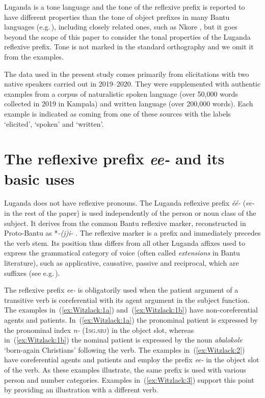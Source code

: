 \documentclass[output=paper,colorlinks,citecolor=brown,
]{langscibook}
\begin{document}
Luganda is a tone language and the tone of the reflexive prefix is reported to have different properties than the tone of object prefixes in many Bantu languages (e.g.\,\citealt{Marlo2015}), including closely related ones, such as Nkore \citep{Poletto1998}, 
but it goes beyond the scope of this paper to consider the tonal properties of the Luganda reflexive prefix. 
Tone is not marked in the standard orthography and we omit it from the examples.

The data used in the present study comes primarily from elicitations with two native speakers carried out in 2019–2020. 
They were supplemented with authentic examples from a corpus of naturalistic spoken language (over 50,000 words collected in 2019 in Kampala) and written language (over 200,000 words). 
Each example is indicated as coming from one of these sources with the labels `elicited', `spoken' and `written'.


\section{The reflexive prefix \emph{ee-} and its basic uses}\label{sec:Witzlack:2}

Luganda does not have reflexive pronouns. 
The Luganda reflexive prefix \emph{éé-} (\emph{ee-} in the rest of the paper) is used independently of the person or noun class of the subject. 
It derives from the common Bantu reflexive marker, reconstructed in Proto-Bantu as *\textit{-(j)i-} \citep[109–110]{Meeussen1967}. 
The reflexive marker is a prefix and immediately precedes the verb stem. 
Its position thus differs from all other Luganda affixes used to express the grammatical category of voice (often called \emph{extensions} in Bantu literature), such as applicative, causative, passive and reciprocal, which are suffixes (see e.g.\,\citealt[173]{SchadebergBostoen2019}).

The reflexive prefix \emph{ee-} is obligatorily used when the patient argument of a transitive verb is coreferential with its agent argument in the subject function. 
The examples in~(\ref{ex:Witzlack:1a}) and~(\ref{ex:Witzlack:1b}) have non-coreferential agents and patients. 
In~(\ref{ex:Witzlack:1a}) the pronominal patient is expressed by the pronominal index \emph{n-} (\textsc{1sg.sbj}) in the object slot, whereas in~(\ref{ex:Witzlack:1b}) the nominal patient is expressed by the noun \emph{abalokole} ‘born-again Christians’ following the verb. 
The examples in~(\ref{ex:Witzlack:2}) have coreferential agents and patients and employ the prefix \emph{ee-} in the object slot of the verb. 
As these examples illustrate, the same prefix is used with various person and number categories. Examples in~(\ref{ex:Witzlack:3}) support this point by providing an illustration with a different verb.
\end{document}
